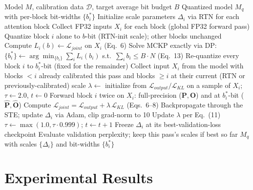 \documentclass[10pt,twocolumn,letterpaper]{article}
\begin{document}
\begin{algorithm}[t]
\scriptsize
\setlength{\baselineskip}{8pt}
\setlength{\algorithmicindent}{0.3em}
\caption{APQ: Attention-Preserving Quantization}
\label{alg:apq}
\begin{algorithmic}[1]
\REQUIRE Model $M$, calibration data $\mathcal{D}$, target average bit budget $B$
\ENSURE Quantized model $M_q$ with per-block bit-widths $\{b_i^*\}$
\STATE Initialize scale parameters $\Delta_i$ via RTN for each attention block
\STATE Collect FP32 inputs $X_i$ for each block (global FP32 forward pass)
        \STATE Quantize block $i$ alone to $b$-bit (RTN-init scale); other blocks unchanged
        \STATE Compute $L_i(b) \leftarrow \mathcal{L}_{joint}$ on $X_i$ (Eq.~6)
    \ENDFOR
\ENDFOR
\STATE Solve MCKP exactly via DP: $\{b_i^*\} \leftarrow \arg\min_{\{b_i\}} \sum_i L_i(b_i)$ s.t.\ $\sum_i b_i \le B \cdot N$ (Eq.~13)
\STATE Re-quantize every block $i$ to $b_i^*$-bit (fixed for the remainder)
        \STATE Collect input $X_i$ from the model with blocks $<i$ already calibrated this pass and blocks $\ge i$ at their current (RTN or previously-calibrated) scale
        \STATE $\lambda \leftarrow$ initialize from $\mathcal{L}_{output}/\mathcal{L}_{KL}$ on a sample of $X_i$; $\tau \leftarrow 2.0$, $t \leftarrow 0$
            \STATE Forward block $i$ twice on $X_i$: full-precision ($\mathbf{P},\mathbf{O}$) and at $b_i^*$-bit ($\hat{\mathbf{P}},\hat{\mathbf{O}}$)
            \STATE Compute $\mathcal{L}_{joint} = \mathcal{L}_{output} + \lambda\,\mathcal{L}_{KL}$ (Eqs.~6--8)
            \STATE Backpropagate through the STE; update $\Delta_i$ via Adam, clip grad-norm to 10
                \STATE Update $\lambda$ per Eq.~(11)
            \ENDIF
            \STATE $\tau \leftarrow \max(1.0, \tau \cdot 0.999)$; $t \leftarrow t+1$
        \ENDWHILE
        \STATE Freeze $\Delta_i$ at its best-validation-loss checkpoint
    \ENDFOR
    \STATE Evaluate validation perplexity; keep this pass's scales if best so far
\ENDFOR
\RETURN $M_q$ with scales $\{\Delta_i\}$ and bit-widths $\{b_i^*\}$
\end{algorithmic}
\end{algorithm}

\section{Experimental Results}
\end{document}
